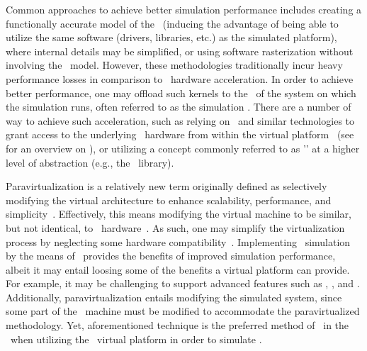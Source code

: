 Common approaches to achieve better simulation performance includes creating a functionally accurate model of the \dvttermgpu\ (inducing the advantage of being able to utilize the same software (drivers, libraries, etc.) as the simulated platform), where internal details may be simplified, or using software rasterization without involving the \dvttermgpu\ model.
However, these methodologies traditionally incur heavy performance losses in comparison to \dvttermgpu\ hardware acceleration.
In order to achieve better performance, one may offload such kernels to the \dvttermgpu\ of the system on which the simulation runs, often referred to as the simulation \dvttermhost .
There are a number of way to achieve such acceleration, such as relying on \dvttermpcipassthrough\ and similar technologies to grant access to the underlying \dvttermhost\ hardware from within the virtual platform~ (see  for an overview on \dvttermpcipassthrough ), or utilizing a concept commonly referred to as '\dvttermparavirtualization ' at a higher level of abstraction (e.g., the \dvttermopengl\ library).

Paravirtualization is a relatively new term originally defined as selectively modifying the virtual architecture to enhance scalability, performance, and simplicity~.
Effectively, this means modifying the virtual machine to be similar, but not identical, to \dvttermhost\ hardware~.
As such, one may simplify the virtualization process by neglecting some hardware compatibility~.
Implementing \dvttermgpu\ simulation by the means of \dvttermparavirtualization\ provides the benefits of improved simulation performance, albeit it may entail loosing some of the benefits a virtual platform can provide.
For example, it may be challenging to support advanced features such as \dvttermdeterministicexecution , \dvttermcheckpointing , and \dvttermreverseexecution .
Additionally, paravirtualization entails modifying the simulated system, since some part of the \dvttermtarget\ machine must be modified to accommodate the paravirtualized methodology.
Yet, aforementioned technique is the preferred method of \dvttermgoogle\ in the \dvttermandroidsdk\ when utilizing the \dvttermqemu\ virtual platform in order to simulate \dvttermopengles .

